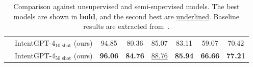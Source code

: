 \documentclass[11pt]{article}
\begin{document}
\begin{table}[ht]
{\begin{tabular}{@{}llcccccc@{}}
                                      & IntentGPT-4$_\text{10 shot}$ (ours) & 94.85 & 80.36 & 85.07 & 83.11 & 59.07 & 70.42\\
                                      & IntentGPT-4$_\text{50 shot}$ (ours) & \textbf{96.06} & \textbf{84.76} & \underline{88.76} & \textbf{85.94} & \textbf{66.66} & \textbf{77.21}\\         
        \bottomrule
    \end{tabular}
    }
    \caption{Comparison against unsupervised and semi-supervised models. The best models are shown in \textbf{bold}, and the second best are \underline{underlined}. Baseline results are extracted from~\citet{kumar2022intent}. }
    \vspace{-3mm}
    \label{tab:75KIR}
\end{table}
 
\end{document}
